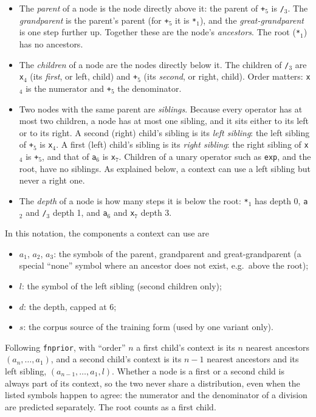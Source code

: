 \documentclass[11pt]{article}
\begin{document}
\begin{itemize}
  \item The \emph{parent} of a node is the node directly above it: the parent of \texttt{+}$_5$ is
  \texttt{/}$_3$. The \emph{grandparent} is the parent's parent (for \texttt{+}$_5$ it is
  \texttt{*}$_1$), and the \emph{great-grandparent} is one step further up. Together these are the
  node's \emph{ancestors}. The root (\texttt{*}$_1$) has no ancestors.
  \item The \emph{children} of a node are the nodes directly below it. The children of \texttt{/}$_3$ are
  \texttt{x}$_4$ (its \emph{first}, or left, child) and \texttt{+}$_5$ (its \emph{second}, or right, child).
  Order matters: \texttt{x}$_4$ is the numerator and \texttt{+}$_5$ the denominator.
  \item Two nodes with the same parent are \emph{siblings}. Because every operator has at most two
  children, a node has at most one sibling, and it sits either to its left or to its right. A second
  (right) child's sibling is its \emph{left sibling}: the left sibling of \texttt{+}$_5$ is
  \texttt{x}$_4$. A first (left) child's sibling is its \emph{right sibling}: the right sibling of
  \texttt{x}$_4$ is \texttt{+}$_5$, and that of \texttt{a}$_6$ is \texttt{x}$_7$. Children of a unary
  operator such as \texttt{exp}, and the root, have no siblings. As explained below, a context can
  use a left sibling but never a right one.
  \item The \emph{depth} of a node is how many steps it is below the root: \texttt{*}$_1$ has depth 0,
  \texttt{a}$_2$ and \texttt{/}$_3$ depth 1, and \texttt{a}$_6$ and \texttt{x}$_7$ depth 3.
\end{itemize}
In this notation, the components a context can use are
\begin{itemize}
  \item $a_1$, $a_2$, $a_3$: the symbols of the parent, grandparent and great-grandparent (a special
  ``none'' symbol where an ancestor does not exist, e.g.\ above the root);
  \item $l$: the symbol of the left sibling (second children only);
  \item $d$: the depth, capped at 6;
  \item $s$: the corpus source of the training form (used by one variant only).
\end{itemize}
Following \texttt{fnprior}, with ``order'' $n$ a first child's context is its $n$ nearest ancestors
$(a_n,\dots,a_1)$, and a second child's context is its $n-1$ nearest ancestors and its left sibling,
$(a_{n-1},\dots,a_1,l)$. Whether a node is a first or a second child is always part of its context, so
the two never share a distribution, even when the listed symbols happen to agree: the numerator and
the denominator of a division are predicted separately. The root counts as a first child.
\end{document}
